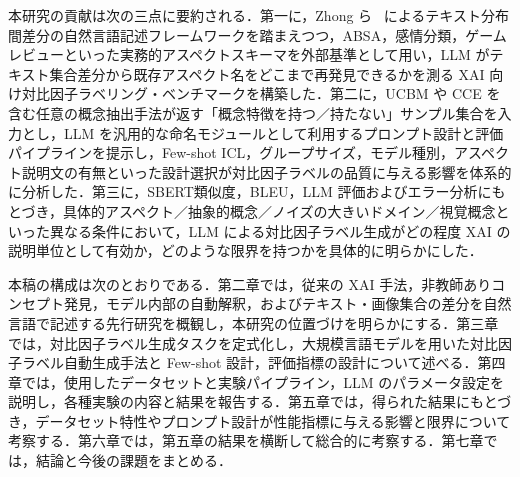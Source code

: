 本研究の貢献は次の三点に要約される．第一に，Zhong ら~\cite{zhong2022describing} によるテキスト分布間差分の自然言語記述フレームワークを踏まえつつ，ABSA，感情分類，ゲームレビューといった実務的アスペクトスキーマを外部基準として用い，LLM がテキスト集合差分から既存アスペクト名をどこまで再発見できるかを測る XAI 向け対比因子ラベリング・ベンチマークを構築した．第二に，UCBM や CCE を含む任意の概念抽出手法が返す「概念特徴を持つ／持たない」サンプル集合を入力とし，LLM を汎用的な命名モジュールとして利用するプロンプト設計と評価パイプラインを提示し，Few-shot ICL，グループサイズ，モデル種別，アスペクト説明文の有無といった設計選択が対比因子ラベルの品質に与える影響を体系的に分析した．第三に，SBERT類似度，BLEU，LLM 評価およびエラー分析にもとづき，具体的アスペクト／抽象的概念／ノイズの大きいドメイン／視覚概念といった異なる条件において，LLM による対比因子ラベル生成がどの程度 XAI の説明単位として有効か，どのような限界を持つかを具体的に明らかにした．

本稿の構成は次のとおりである．第二章では，従来の XAI 手法，非教師ありコンセプト発見，モデル内部の自動解釈，およびテキスト・画像集合の差分を自然言語で記述する先行研究を概観し，本研究の位置づけを明らかにする．第三章では，対比因子ラベル生成タスクを定式化し，大規模言語モデルを用いた対比因子ラベル自動生成手法と Few-shot 設計，評価指標の設計について述べる．第四章では，使用したデータセットと実験パイプライン，LLM のパラメータ設定を説明し，各種実験の内容と結果を報告する．第五章では，得られた結果にもとづき，データセット特性やプロンプト設計が性能指標に与える影響と限界について考察する．第六章では，第五章の結果を横断して総合的に考察する．第七章では，結論と今後の課題をまとめる．
